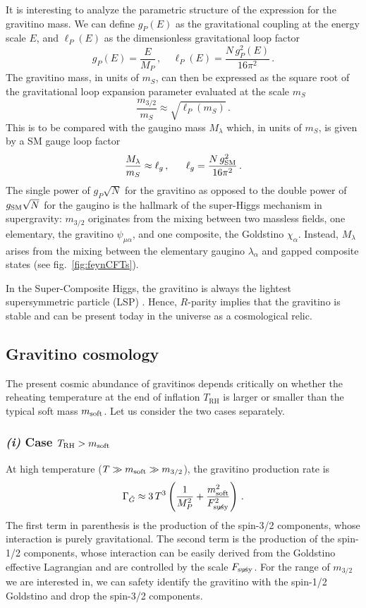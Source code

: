 \documentclass[a4paper,12pt]{article}
\newcommand{\beq}{\begin{equation}}
\newcommand{\eeq}{\end{equation}}
\def\fig#1{fig.~\ref{#1}}
\def\fig#1{fig.~\ref{#1}}
\def\mS{m_S}
\def\Fs{F_ {{\rm susy}\! \! \! \! \! \! \! \!\diagup \,\,\,}}
\def\msoft{m_{\rm soft}}
\def\mgra{m_{3/2}}
\def\TR{T_{\textrm{RH}}}
\begin{document}
{{{{It is interesting to analyze the parametric structure of the expression for the gravitino mass. We can define $g_P(E)$ as the gravitational coupling at the energy scale $E$, and $\ell_P(E)$ as the dimensionless gravitational loop factor
\beq
g_P(E)=\frac{E}{M_P} \, , ~~~~~\ell_P(E)= \frac{N\, g_P^2(E)}{16\pi^2} \, .
\eeq
The gravitino mass, in units of $\mS$, can then be expressed as the square root of the gravitational loop expansion parameter evaluated at the scale $\mS$
\beq
\frac{\mgra}{\mS} \approx \sqrt{\ell_P(\mS)} \, .
\eeq
This is to be compared with the gaugino mass $M_\lambda$ which, in units of $\mS$, is given by a SM gauge loop factor
\beq
\frac{M_\lambda}{\mS} \approx \ell_g \, , ~~~~~\ell_g = \frac{N\, g_{\rm SM}^2}{16\pi^2}\, .
\eeq 
The single power of $g_P\sqrt N$ for the gravitino as opposed to the double power of $g_{\rm SM}\sqrt N$ for the gaugino is the hallmark of the super-Higgs mechanism in supergravity: $\mgra$ originates from the mixing between two  massless fields, one elementary, the gravitino $\psi_{\mu \alpha}$, and one composite,  the Goldstino $\chi_\alpha$. Instead, $M_\lambda$ arises  from the mixing between the elementary gaugino $\lambda_\alpha$ and gapped composite states (see \fig{fig:feynCFTs}).  

In the Super-Composite Higgs, the gravitino is always the lightest supersymmetric particle (LSP) . Hence, $R$-parity implies that the gravitino is stable and can be present today in the universe as a cosmological relic.

\subsection{Gravitino cosmology}
\label{sec:gravcos}

The present cosmic abundance of gravitinos depends critically on whether the reheating temperature at the end of inflation $\TR$ is larger or smaller than the typical soft mass $\msoft$. Let us consider the two cases separately.

\boldmath
\subsubsection*{\textit{(i)} Case $\TR > \msoft$}
\unboldmath

At high temperature ($T\gg \msoft \gg \mgra$), the gravitino production rate is \cite{Pradler:2006qh,Rychkov:2007uq}
\beq
\Gamma_{\tilde G} \approx 3\,{T^3}\left(\frac{1}{M_P^2} + \frac{\msoft^2}{\Fs^2}\right)\, .
\label{rateG}
\eeq
The first term in parenthesis is the production of the spin-3/2 components, whose interaction is purely gravitational. The second term is the production of the spin-1/2 components, whose interaction can be easily derived from the Goldstino effective Lagrangian and are controlled by the scale $\Fs$. For the range of $\mgra$ we are interested in, we can safety identify the gravitino with the spin-1/2 Goldstino and drop the spin-3/2 components.

}}}}
\end{document}
